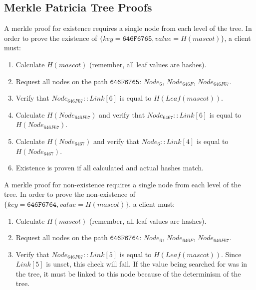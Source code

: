 \subsection{Merkle Patricia Tree Proofs}

A merkle proof for existence requires a single node from each level of the tree.
In order to prove the existence of $\{key = \texttt{646F6765}, value = H(mascot)\}$, a client must:
\begin{enumerate}
	\item{Calculate $H(mascot)$ (remember, all leaf values are hashes).}
	\item{Request all nodes on the path $\texttt{646F6765}$: $Node_{6}$, $Node_{646F}$, $Node_{646F67}$.}
	\item{Verify that $Node_{646F67}::Link[6]$ is equal to $H(Leaf(mascot))$.}
	\item{Calculate $H(Node_{646F67})$ and verify that $Node_{6467}::Link[6]$ is equal to $H(Node_{646F67})$.}
	\item{Calculate $H(Node_{6467})$ and verify that $Node_{6}::Link[4]$ is equal to $H(Node_{6467})$.}
	\item{Existence is proven if all calculated and actual hashes match.}
\end{enumerate}

A merkle proof for non-existence requires a single node from each level of the tree.
In order to prove the non-existence of $\{key = \texttt{646F6764}, value = H(mascot)\}$, a client must:
\begin{enumerate}
	\item{Calculate $H(mascot)$ (remember, all leaf values are hashes).}
	\item{Request all nodes on the path $\texttt{646F6764}$: $Node_{6}$, $Node_{646F}$, $Node_{646F67}$.}
	\item{
		Verify that $Node_{646F67}::Link[5]$ is equal to $H(Leaf(mascot))$.
		Since $Link[5]$ is unset, this check will fail.
		If the value being searched for was in the tree, it must be linked to this node because of the determinism of the tree.
	 }
\end{enumerate}
